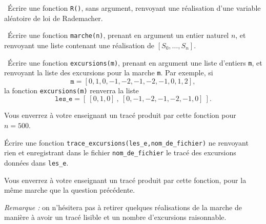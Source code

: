 \medskip

\question\ Écrire une fonction \texttt{R()}, sans argument, renvoyant une réalisation d'une variable aléatoire de loi de Rademacher. 

\medskip

\question\ Écrire une fonction \texttt{marche(n)}, prenant en argument un entier naturel $n$, et renvoyant une liste contenant une réalisation de $[S_0,\dots,S_n]$. 

\medskip

\question\ Écrire une fonction \texttt{excursions(m)}, prenant en argument une liste d'entiers \texttt{m}, et renvoyant la liste des excursions pour la marche \texttt{m}. Par exemple, si 
  \begin{equation*}
    \texttt{m} = [0,1,0,-1,-2,-1,-2,-1,0,1,2],
  \end{equation*}
la fonction \texttt{excursions(m)} renverra la liste 
  \begin{equation*}
    \texttt{les\_e}  = [~[0,1,0]~,~[0,-1,-2,-1,-2,-1,0]~].
  \end{equation*}
  

\question

  Vous enverrez à votre enseignant un tracé produit par cette fonction pour $n=500$. 

  \medskip

\question%
Écrire une fonction \texttt{trace\_excursions(les\_e,nom\_de\_fichier)} ne renvoyant rien et enregistrant dans le fichier \texttt{nom\_de\_fichier} le tracé des excursions données dans \texttt{les\_e}.

  Vous enverrez à votre enseignant un tracé produit par cette fonction, pour la même marche que la question précédente.
  
  \emph{Remarque :} on n'hésitera pas à retirer quelques réalisations de la marche de manière à avoir un tracé lisible et un nombre d'excursions raisonnable.  
